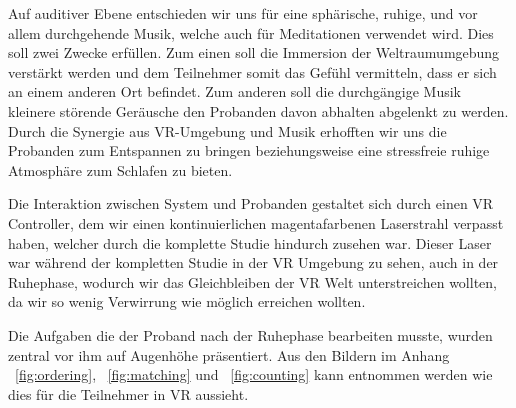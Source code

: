 Auf auditiver Ebene entschieden wir uns für eine sphärische, ruhige, und vor allem durchgehende Musik, welche auch für Meditationen verwendet wird. Dies soll zwei Zwecke erfüllen. Zum einen soll die Immersion der Weltraumumgebung verstärkt werden und dem Teilnehmer somit das Gefühl vermitteln, dass er sich an einem anderen Ort befindet. Zum anderen soll die durchgängige Musik kleinere störende Geräusche den Probanden davon abhalten abgelenkt zu werden.
Durch die Synergie aus VR-Umgebung und Musik erhofften wir uns die Probanden zum Entspannen zu bringen beziehungsweise eine stressfreie ruhige Atmosphäre zum Schlafen zu bieten.

Die Interaktion zwischen System und Probanden gestaltet sich durch einen VR Controller, dem wir einen kontinuierlichen magentafarbenen Laserstrahl verpasst haben, welcher durch die komplette Studie hindurch zusehen war. Dieser Laser war während der kompletten Studie in der VR Umgebung zu sehen, auch in der Ruhephase, wodurch wir das Gleichbleiben der VR Welt unterstreichen wollten, da wir so wenig Verwirrung wie möglich erreichen wollten.

Die Aufgaben die der Proband nach der Ruhephase bearbeiten musste, wurden zentral vor ihm auf Augenhöhe präsentiert. Aus den Bildern im Anhang ~\ref{fig:ordering}, ~\ref{fig:matching} und ~\ref{fig:counting} kann entnommen werden wie dies für die Teilnehmer in VR aussieht.